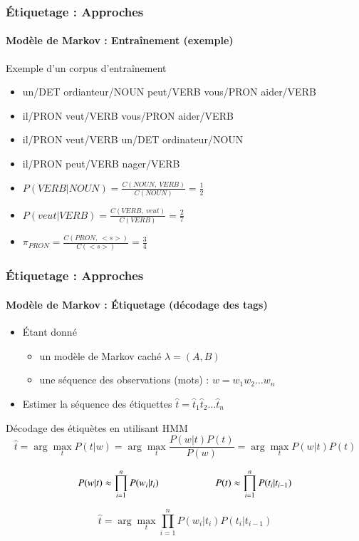 \documentclass[xcolor=table]{beamer}
\begin{document}
\begin{frame}
\frametitle{Étiquetage : Approches}
\framesubtitle{Modèle de Markov : Entraînement (exemple)}

\begin{exampleblock}{Exemple d'un corpus d'entraînement}
	\begin{itemize}
		\item un/DET ordianteur/NOUN peut/VERB vous/PRON aider/VERB
		\item il/PRON veut/VERB vous/PRON aider/VERB
		\item il/PRON veut/VERB un/DET ordinateur/NOUN
		\item il/PRON peut/VERB nager/VERB
	\end{itemize}
\end{exampleblock}

\begin{itemize}
	\item $P(VERB | NOUN) = \frac{C(NOUN,\ VERB)}{C(NOUN)} = \frac{1}{2}$
	\item $P(veut | VERB) = \frac{C(VERB,\ veut)}{C(VERB)} = \frac{2}{7}$
	\item $\pi_{PRON} = \frac{C(PRON,\ <s>)}{C(<s>)} = \frac{3}{4} $
\end{itemize}

\end{frame}

\begin{frame}
\frametitle{Étiquetage : Approches}
\framesubtitle{Modèle de Markov : Étiquetage (décodage des tags)}

\begin{itemize}
	\item Étant donné 
	\begin{itemize}
		\item un modèle de Markov caché $\lambda = (A, B)$
		\item une séquence des observations (mots) : $w = w_1 w_2 \ldots w_n$
	\end{itemize}
	\item Estimer la séquence des étiquettes $\hat{t} = \hat{t}_1 \hat{t}_2 \ldots \hat{t}_n$
\end{itemize}

\begin{block}{Décodage des étiquètes en utilisant HMM}
	\[
	\hat{t} = \arg\max\limits_t P(t | w) = \arg\max\limits_t \frac{P(w|t) P(t)}{P(w)} = \arg\max\limits_t P(w|t) P(t)%
	\]
	
	\[ 
	P(w | t) \approx \prod\limits_{i=1}^n P(w_i|t_i) 
	\hskip2cm
	P(t) \approx \prod\limits_{i=1}^n P(t_i|t_{i-1}) 
	\]
	
	\[
	\hat{t} = \arg\max\limits_t \prod\limits_{i=1}^n P(w_i|t_i) P(t_i|t_{i-1})
	\]
\end{block}

\end{frame}
\end{document}
